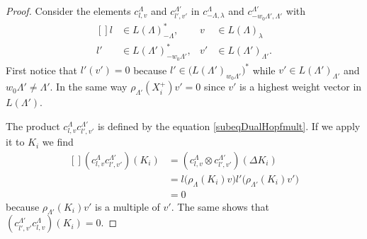 \begin{proof}
	Consider the elements \( c^{\Lambda}_{l,v}\) and \( c_{l',v'}^{\Lambda'}\) in \( c^{\Lambda}_{-\Lambda,\lambda} \) and \( c^{\Lambda'}_{-w_0\Lambda',\Lambda'}\) with
	\begin{equation}
		\begin{aligned}[]
			l  & \in L(\Lambda)^*_{-\Lambda},      & v  & \in L(\Lambda)_{\lambda}    \\
			l' & \in L(\Lambda')^*_{-w_0\Lambda'}, & v' & \in L(\Lambda')_{\Lambda'}.
		\end{aligned}
	\end{equation}
	First notice that \( l'(v')=0\) because \( l'\in \big( L(\Lambda')_{w_0\Lambda'} \big)^*\) while \( v'\in L(\Lambda')_{\Lambda'}\) and \( w_0\Lambda'\neq \Lambda'\). In the same way \( \rho_{\Lambda'}(X_i^+)v'=0\) since \( v'\) is a highest weight vector in \( L(\Lambda')\).

	The product \( c^{\Lambda}_{l,v}c^{\Lambda'}_{l',v'}\) is defined by the equation \eqref{subeqDualHopfmult}. If we apply it to \( K_i\) we find
	\begin{equation}
		\begin{aligned}[]
			(c^{\Lambda}_{l,v}c^{\Lambda'}_{l',v'})(K_i) & =(c^{\Lambda}_{l,v}\otimes c^{\Lambda'}_{l',v'})(\Delta K_i)           \\
			                                             & =l\big( \rho_{\Lambda}(K_i)v \big)l'\big( \rho_{\Lambda'}(K_i)v' \big) \\
			                                             & =0
		\end{aligned}
	\end{equation}
	because \( \rho_{\Lambda'}(K_i)v'\) is a multiple of \( v'\). The same shows that \( (c^{\Lambda'}_{l',v'}c^{\Lambda}_{l,v})(K_i)=0\).


\end{proof}
